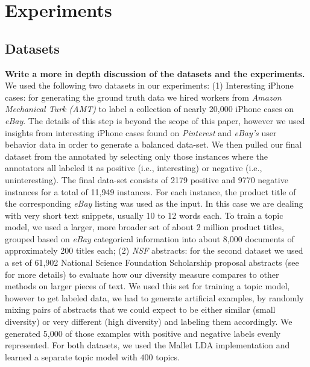 \documentclass{article}
\begin{document}

\section{Experiments}
\label{sec:experiments}

\subsection{Datasets}
\label{sec:datasets}
{\bf Write a more in depth discussion of the datasets and the
  experiments. }
We used the following two datasets in our experiments: (1) Interesting iPhone cases:
for generating the ground truth data we hired workers from {\em Amazon Mechanical Turk (AMT)} to label a collection
of nearly 20,000 iPhone cases on {\em eBay}. The details of this step is beyond the scope of this paper, however we used insights from
interesting iPhone cases found on {\em Pinterest} and {\em eBay's} user behavior data in order to generate a balanced data-set. 
We then pulled our final dataset from the annotated by selecting only those instances where the annotators all labeled it as
positive (i.e., interesting) or negative (i.e., uninteresting). The final data-set consists of 2179 positive and 9770 negative instances for
a total of 11,949 instances. For each instance, the product title of
the corresponding {\em eBay} listing was used as the input. In this case we are
dealing with very short text snippets, usually 10 to 12 words each. To
train a topic model, we used a larger, more broader set of about
2 million product titles, grouped based on {\em eBay} categorical information into about 8,000
documents of approximately 200 titles each; (2) {\em NSF}
abstracts: for the second dataset we used a set of 61,902 National Science Foundation
Scholarship proposal abstracts (see~\cite{bache:2013} for more details) to evaluate how our diversity measure
compares to other methods on larger pieces of text. We used this set
for training a topic model, however to get labeled data, we had to
generate artificial examples, by randomly mixing pairs of abstracts that we
could expect to be either similar (small diversity) or very different
(high diversity) and labeling them accordingly. We generated 5,000 of
those examples with positive and negative labels evenly represented. For both datasets, we used the Mallet LDA implementation and learned a separate topic model with $400$ topics.
\end{document}
